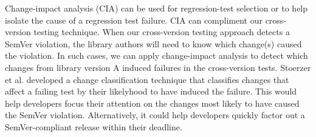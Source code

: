 Change-impact analysis (CIA) \cite{Chianti,FaultTracer,Stoerzer} can
be used for regression-test selection or to help isolate the cause of
a regression test failure.
%
CIA can compliment our cross-version testing technique.
%
When our cross-version testing approach detects a SemVer violation,
the library authors will need to know which change(s) caused the
violation. In such cases, we can apply change-impact analysis
\cite{Stoerzer} to detect which changes from library version A induced
failures in the cross-version tests. Stoerzer et al. \cite{Stoerzer}
developed a change classification technique that classifies changes
that affect a failing test by their likelyhood to have induced the
failure. This would help developers focus their attention on the
changes most likely to have caused the SemVer
violation. Alternatively, it could help developers quickly factor out
a SemVer-compliant release within their deadline.


